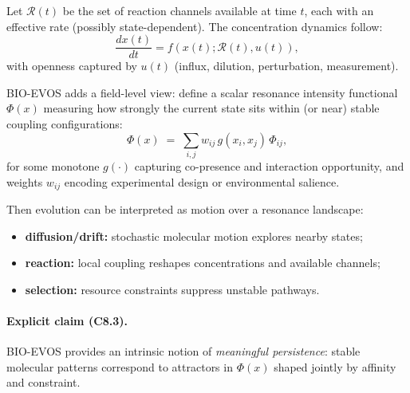 \documentclass[11pt]{article}
\begin{document}
Let $\mathcal{R}(t)$ be the set of reaction channels available at time $t$, each with an
effective rate (possibly state-dependent). The concentration dynamics follow:
\[
\frac{dx(t)}{dt} = f(x(t);\mathcal{R}(t),u(t)),
\]
with openness captured by $u(t)$ (influx, dilution, perturbation, measurement).

BIO-EVOS adds a field-level view: define a scalar resonance intensity functional
$\Phi(x)$ measuring how strongly the current state sits within (or near) stable coupling
configurations:
\[
\Phi(x)\;=\;\sum_{i,j} w_{ij}\, g(x_i,x_j)\,\Phi_{ij},
\]
for some monotone $g(\cdot)$ capturing co-presence and interaction opportunity, and
weights $w_{ij}$ encoding experimental design or environmental salience.

Then evolution can be interpreted as motion over a resonance landscape:
\begin{itemize}
  \item \textbf{diffusion/drift:} stochastic molecular motion explores nearby states;
  \item \textbf{reaction:} local coupling reshapes concentrations and available channels;
  \item \textbf{selection:} resource constraints suppress unstable pathways.
\end{itemize}

\paragraph{Explicit claim (C8.3).}
BIO-EVOS provides an intrinsic notion of \emph{meaningful persistence}: stable molecular
patterns correspond to attractors in $\Phi(x)$ shaped jointly by affinity and constraint.
\end{document}
